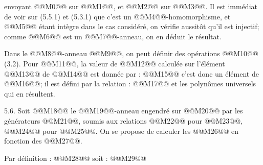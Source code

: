 
envoyant @@M0@@ sur @@M1@@, et @@M2@@ sur @@M3@@. Il est immédiat de voir sur (5.5.1) et (5.3.1) que c'est un @@M4@@-homomorphisme, et @@M5@@ étant intègre dans le cas considéré, on vérifie aussitôt qu'il est injectif; comme @@M6@@ est un @@M7@@-anneau, on en déduit le résultat.

Dans le @@M8@@-anneau @@M9@@, on peut définir des opérations @@M10@@ (3.2). Pour @@M11@@, la valeur de @@M12@@ calculée sur l'élément @@M13@@ de @@M14@@ est donnée par :
@@M15@@
c'est donc un élément de @@M16@@; il est défini par la relation :
@@M17@@
et les polynômes universels qui en résultent.


5.6. Soit @@M18@@ le @@M19@@-anneau engendré sur @@M20@@ par les générateurs @@M21@@, soumis aux relations @@M22@@ pour @@M23@@, @@M24@@ pour @@M25@@. On se propose de calculer les @@M26@@ en fonction des @@M27@@.

Par définition :
@@M28@@
soit :
@@M29@@

